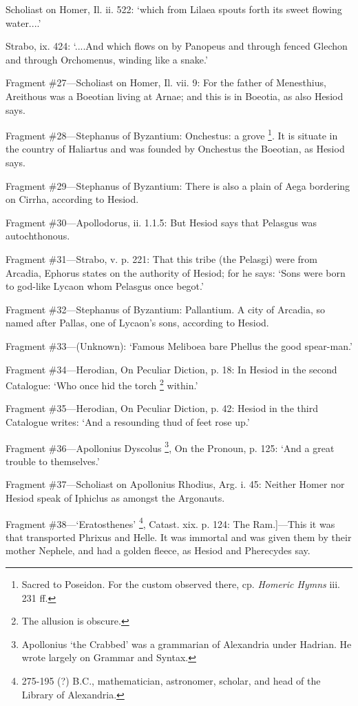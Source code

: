 Scholiast on Homer, Il. ii. 522: ‘which from Lilaea spouts forth its
sweet flowing water....’

Strabo, ix. 424: ‘....And which flows on by Panopeus and through fenced
Glechon and through Orchomenus, winding like a snake.’

Fragment \#27—Scholiast on Homer, Il. vii. 9: For the father of
Menesthius, Areithous was a Boeotian living at Arnae; and this is in Boeotia,
as also Hesiod says.

Fragment \#28—Stephanus of Byzantium: Onchestus: a grove \footnote{Sacred to Poseidon. For
the custom observed there, cp. \emph{Homeric Hymns} iii. 231 ff.}. It is situate in the country of
Haliartus and was founded by Onchestus the Boeotian, as Hesiod says.

Fragment \#29—Stephanus of Byzantium: There is also a plain of Aega
bordering on Cirrha, according to Hesiod.

Fragment \#30—Apollodorus, ii. 1.1.5: But Hesiod says that Pelasgus was
autochthonous.

Fragment \#31—Strabo, v. p. 221: That this tribe (the Pelasgi) were from
Arcadia, Ephorus states on the authority of Hesiod; for he says: ‘Sons
were born to god-like Lycaon whom Pelasgus once begot.’

Fragment \#32—Stephanus of Byzantium: Pallantium. A city of Arcadia, so
named after Pallas, one of Lycaon’s sons, according to Hesiod.

Fragment \#33—(Unknown): ‘Famous Meliboea bare Phellus the good
spear-man.’

Fragment \#34—Herodian, On Peculiar Diction, p. 18: In Hesiod in the
second Catalogue: ‘Who once hid the torch \footnote{The allusion is obscure.}
within.’

Fragment \#35—Herodian, On Peculiar Diction, p. 42: Hesiod in the third
Catalogue writes: ‘And a resounding thud of feet rose up.’

Fragment \#36—Apollonius Dyscolus \footnote{Apollonius ‘the
Crabbed’ was a grammarian of Alexandria under Hadrian. He wrote largely
on Grammar and Syntax.}, On the
Pronoun, p. 125: ‘And a great trouble to themselves.’

Fragment \#37—Scholiast on Apollonius Rhodius, Arg. i. 45: Neither Homer
nor Hesiod speak of Iphiclus as amongst the Argonauts.

Fragment \#38—‘Eratosthenes’ \footnote{275-195 (?) B.C.,
mathematician, astronomer, scholar, and head of the Library of Alexandria.}, Catast.
xix. p. 124: The Ram.]—This it was that transported Phrixus and Helle. It
was immortal and was given them by their mother Nephele, and had a golden
fleece, as Hesiod and Pherecydes say.

